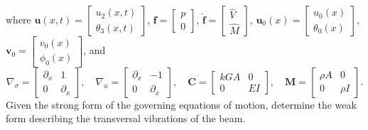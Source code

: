 \documentclass[12pt]{article}
\begin{document}
where
$\mathbf{u}\left(x, t\right)=
    \begin{bmatrix}
        u_2(x, t) \\
        \theta_3\left(x, t\right)
    \end{bmatrix}$,
${\mathbf{f}}=
    \begin{bmatrix}
        p \\
        0
    \end{bmatrix}$,
$\hat{\mathbf{f}}=
    \begin{bmatrix}
        \hat V \\
        \hat M
    \end{bmatrix}$,
$\mathbf{u}_0\left(x\right)=
    \begin{bmatrix}
        u_0(x) \\
        \theta_0(x)
    \end{bmatrix}$,
$\mathbf{v}_0=
    \begin{bmatrix}
        v_0(x) \\
        \phi_0(x)
    \end{bmatrix}$,
and
$$
    \nabla_\sigma=\left[\begin{array}{cc}
            \partial_{x} & 1            \\
            0            & \partial_{x}
        \end{array}\right], \quad \nabla_u=\left[\begin{array}{cc}
            \partial_{x} & -1           \\
            0            & \partial_{x}
        \end{array}\right], \quad \mathbf{C}=\left[\begin{array}{cc}
            k G A & 0   \\
            0     & E I
        \end{array}\right], \quad \mathbf{M}=\left[\begin{array}{cc}
            \rho A & 0      \\
            0      & \rho I
        \end{array}\right].
$$
Given the strong form of the governing equations of motion, determine the weak form describing the transversal vibrations of the beam.



\end{document}
